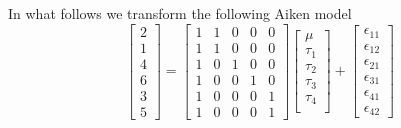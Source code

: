 \documentclass[paper=a4, fontsize=11pt]{scrartcl} %
\begin{document}
\bigskip
\bigskip
In what follows we transform the following Aiken model
$$
\begin{bmatrix} 
2\\ 1\\ 4 \\ 6 \\ 3\\ 5  
\end{bmatrix}
=
\begin{bmatrix} 1 & 1 & 0 & 0 & 0 \\
                             1 & 1 & 0 & 0 & 0 \\
                             1 & 0 & 1 & 0 & 0\\
                             1 & 0 & 0 & 1 & 0 \\
                             1 & 0 & 0 & 0 & 1\\
                             1 & 0 & 0 & 0 & 1
\end{bmatrix}
\begin{bmatrix} 
\mu \\ \tau_1\\ \tau_2 \\ \tau_3 \\ \tau_4 \\ 
\end{bmatrix}
+ 
\begin{bmatrix} 
\epsilon_{1 1 } \\ \epsilon_{1 2}\\ \epsilon_{2 1} \\ \epsilon_{3 1} \\ \epsilon_{4 1} \\\epsilon_{42}  
\end{bmatrix}
$$
\end{document}
